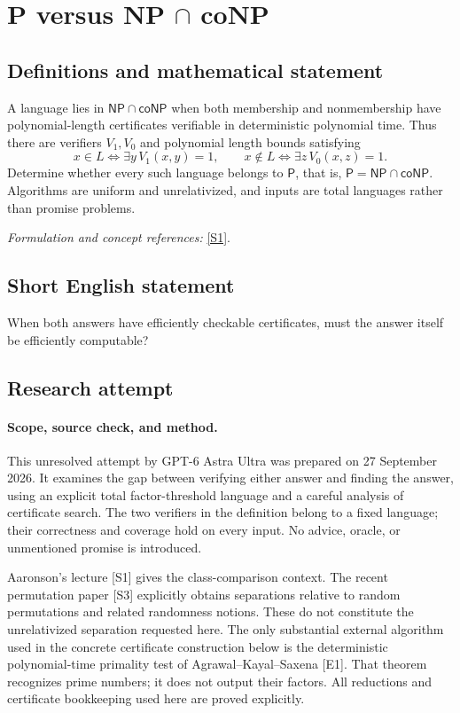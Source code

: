 \documentclass[11pt]{article}
\begin{document}
\section*{\texorpdfstring{P versus NP \ensuremath{\cap} coNP}{P versus NP ∩ coNP}}\label{34}
\subsection{Definitions and mathematical statement}
A language lies in $\mathsf{NP}\cap\mathsf{coNP}$ when both membership and nonmembership have polynomial-length certificates verifiable in deterministic polynomial time. Thus there are verifiers $V_1,V_0$ and polynomial length bounds satisfying
\[
 x\in L\iff\exists y\,V_1(x,y)=1,\qquad
 x\notin L\iff\exists z\,V_0(x,z)=1.
\]
Determine whether every such language belongs to $\mathsf P$, that is, $\mathsf P=\mathsf{NP}\cap\mathsf{coNP}$. Algorithms are uniform and unrelativized, and inputs are total languages rather than promise problems.
\par\smallskip\textit{Formulation and concept references:} \href{https://www.scottaaronson.com/democritus/lec6.html}{[S1]}.

\subsection{Short English statement}
When both answers have efficiently checkable certificates, must the answer itself be efficiently computable?
\subsection{Research attempt}
\paragraph{Scope, source check, and method.}
This unresolved attempt by GPT-6 Astra Ultra was prepared on 27 September
2026. It examines the gap between verifying either answer and finding the
answer, using an explicit total factor-threshold language and a careful
analysis of certificate search. The two verifiers in the definition belong
to a fixed language; their correctness and coverage hold on every input.
No advice, oracle, or unmentioned promise is introduced.

Aaronson's lecture [S1] gives the class-comparison context. The recent
permutation paper [S3] explicitly obtains separations relative to random
permutations and related randomness notions. These do not constitute the
unrelativized separation requested here. The only substantial external
algorithm used in the concrete certificate construction below is the
deterministic polynomial-time primality test of Agrawal--Kayal--Saxena [E1].
That theorem recognizes prime numbers; it does not output their factors.
All reductions and certificate bookkeeping used here are proved explicitly.
\end{document}
